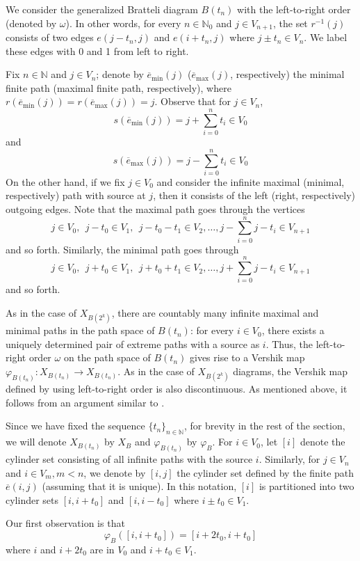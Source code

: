 \documentclass[11pt,reqno]{amsart}
\theoremstyle{definition}
\theoremstyle{remark}
\theoremstyle{plain}
\def\ol{\overline}
\newcommand{\N}{\mathbb N}
\newcommand{\be}{\begin{equation}}
\newcommand{\ee}{\end{equation}}
\numberwithin{equation}{section}
\begin{document}
We consider the generalized Bratteli diagram $B(t_n)$ with the left-to-right order (denoted by $\omega$). In other words, for every $n\in \N_0$ and $j \in V_{n+1}$, the set $r^{-1}(j)$ consists of two edges $e(j-t_n, j)$ and $e(i+t_n, j)$ where $j \pm t_n \in V_{n}$. We label these edges with 0 and 1 from left to right.

Fix $n \in \N$ and $j \in V_n$; denote by $\ol{e}_{\mathrm{min}} (j)$ ($\ol{e}_{\mathrm{max}} (j)$, respectively) the minimal finite path (maximal finite path, respectively), where 
$r(\ol{e}_{\mathrm{min}} (j)) = r(\ol{e}_{\mathrm{max}} (j)) = j$. Observe that for $j \in V_n$,
\[
s(\ol{e}_{\mathrm{min}} (j)) = j + \sum_{i=0}^{n} t_i \in V_0
\] and 
\[
s(\ol{e}_{\mathrm{max}} (j)) = j- \sum_{i=0}^{n} t_i \in V_0
\] 
On the other hand, if we fix $j \in V_0$ and consider the infinite maximal (minimal, respectively) path with source at $j$, then it consists of the left (right, respectively) outgoing edges. Note that the maximal path goes through the vertices
\[j \in V_0,\ \ j-t_0 \in V_1,\ \ j-t_0-t_1 \in V_2, \ldots, j- \sum_{i=0}^n j-t_i \in V_{n+1}\] 
and so forth. Similarly, the minimal path goes through
\[j \in V_0,\ \ j+t_0 \in V_1,\ \ j+t_0+t_1 \in V_2, \ldots, j+ \sum_{i=0}^n j-t_i \in V_{n+1}\] 
and so forth. 

As in the case of $X_{B(2^k)}$, there are countably many infinite maximal and minimal paths in the path space of $B(t_n)$: for every $i \in V_0$, there exists a uniquely determined pair of extreme paths with a source as $i$. Thus, the left-to-right order $\omega$ on the path space of $B(t_n)$ gives rise to a Vershik map $\varphi_{B(t_n)}: X_{B(t_n)} \rightarrow X_{B(t_n)}$. As in the case of $X_{B(2^k)}$ diagrams, the Vershik map defined by using left-to-right order is also discontinuous. As mentioned above, it follows from an argument similar to \cite[Theorem 3.10]{BezuglyiJorgensenKarpelSanadhya2025}.

Since we have fixed the sequence $\{t_n\}_{n\in \N}$, for brevity in the rest of the section, we will denote $X_{B(t_n)} $ by $X_{B} $ and $\varphi_{B(t_n)}$ by $\varphi_{B}$. For $i \in V_0$, let $[i]$ denote the cylinder set consisting of all infinite paths with the source $i$. Similarly, for $j\in V_n$ and $i \in V_m, m <n$, we denote by $[i, j]$ the cylinder set defined by the finite path $\ol e(i,j)$ (assuming that it is unique). In this notation, $[i]$ is partitioned into two cylinder sets $[i,i+t_0]$ and $[i,i-t_0]$ where $i\pm t_0 \in V_1$. 

Our first observation is that 
\be\label{eq s7 i, i_t_0}
\varphi_{B}([i,i+t_0])  = [i+2t_0, i+t_0] 
\ee
where $i$ and $i+2 t_0$ are in $V_0$ and $i + t_0 \in V_1$. 
\end{document}
